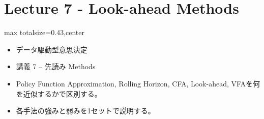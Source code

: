 \section*{Lecture 7 - Look-ahead Methods}

\clearpage
{}
\begin{minipage}[t]{0.405\textwidth}
\begin{adjustbox}{max totalsize={\textwidth}{0.43\textheight},center}
\begin{minipage}{\textwidth}\scriptsize
{}\begin{itemize}
\item データ駆動型意思決定
\item 講義 7 – 先読み Methods
\end{itemize}\begin{itemize}
\item Policy Function Approximation, Rolling Horizon, CFA, Look-ahead, VFAを何を近似するかで区別する。
\item 各手法の強みと弱みを1セットで説明する。
\end{itemize}
\end{minipage}
\end{adjustbox}
\end{minipage}\hfill
